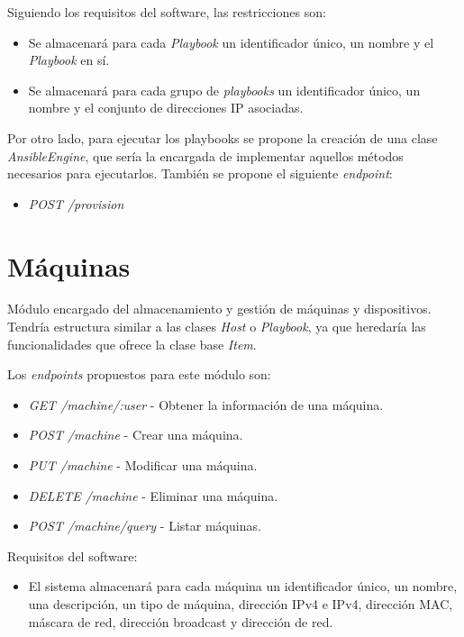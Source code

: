 \bigskip
Siguiendo los requisitos del software, las restricciones son:
\begin{itemize}
	\item Se almacenará para cada \textit{Playbook} un identificador único, un nombre y el \textit{Playbook} en sí.
	\item Se almacenará para cada grupo de \textit{playbooks} un identificador único, un nombre y el conjunto de direcciones IP asociadas.
\end{itemize}

\bigskip
Por otro lado, para ejecutar los playbooks se propone la creación de una clase \textit{AnsibleEngine}, que sería la encargada de implementar aquellos métodos necesarios para ejecutarlos. También se propone el siguiente \textit{endpoint}:
\begin{itemize}
	\item \textit{POST /provision}
\end{itemize}




\section{Máquinas}

Módulo encargado del almacenamiento y gestión de máquinas y dispositivos. Tendría estructura similar a las clases \textit{Host} o \textit{Playbook}, ya que heredaría las funcionalidades que ofrece la clase base \textit{Item}.

\bigskip
Los \textit{endpoints} propuestos para este módulo son:
\begin{itemize}
	\item \textit{GET /machine/:user} - Obtener la información de una máquina.
	\item \textit{POST /machine} - Crear una máquina.
	\item \textit{PUT /machine} - Modificar una máquina.
	\item \textit{DELETE /machine} - Eliminar una máquina.
	\item \textit{POST /machine/query} - Listar máquinas.
\end{itemize}



\bigskip
Requisitos del software:
\begin{itemize}
	\item El sistema almacenará para cada máquina un identificador único, un nombre, una descripción, un tipo de máquina, dirección IPv4 e IPv4, dirección MAC, máscara de red, dirección broadcast y dirección de red.
\end{itemize}





